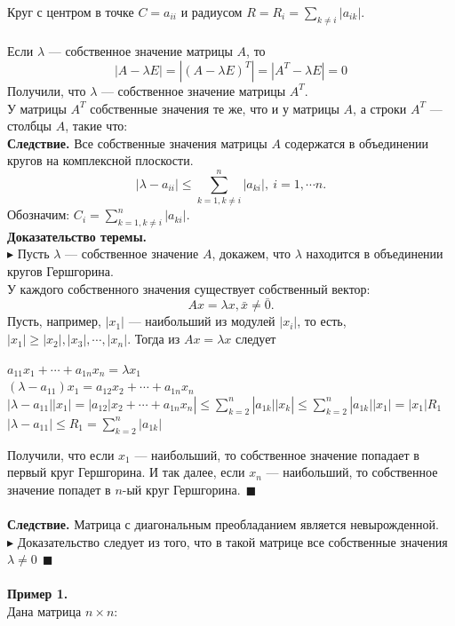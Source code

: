 \documentclass[12pt]{article}
\theoremstyle{definition}
\numberwithin{equation}{section}
\begin{document}
	Круг с центром в точке $C=a_{ii}$ и радиусом $R=R_i=\sum\limits_{k\neq i}|a_{ik}|.$\\
	\\
	Если $\lambda$ --- собственное значение матрицы $A$, то
	$$|A-\lambda E|=|(A-\lambda E)^T|=|A^T-\lambda E|=0$$
	Получили, что $\lambda$ --- собственное значение матрицы $A^T$.\\ 
	У матрицы $A^T$ собственные значения те же, что и у матрицы $A$, а строки $A^T$ --- столбцы $A$, такие что:\\
	\textbf{Следствие.} Все собственные значения матрицы $A$ содержатся в объединении кругов на комплексной плоскости. $$|\lambda-a_{ii}|\leqslant \sum\limits_{k=1, k\neq i}^n|a_{ki}|,~i=1,\cdots n.$$
	Обозначим: $C_i=\sum\limits_{k=1, k\neq i}^n|a_{ki}|.$\\
	\textbf{Доказательство теремы.}\\
	$\blacktriangleright$ Пусть $\lambda$ --- собственное значение $A$, докажем, что $\lambda$ находится в объединении кругов Гершгорина.\\
	У каждого собственного значения существует собственный вектор: $$Ax=\lambda x, \bar x\neq \bar 0.$$
	Пусть, например, $|x_1|$ --- наибольший из модулей $|x_i|$, то есть, $|x_1|\geqslant|x_2|,|x_3|,\cdots,|x_n|$. Тогда из $Ax=\lambda x$ следует
	\begin{center}
		$a_{11}x_1+\cdots+a_{1n}x_n=\lambda x_1$\\
		$(\lambda-a_{11})x_1=a_{12}x_2+\cdots+a_{1n}x_n$\\
		$|\lambda-a_{11}||x_1|=|a_{12}|x_2+\cdots+a_{1n}x_n|\leqslant\sum\limits_{k=2}^n|a_{1k}||x_k|\leqslant\sum\limits_{k=2}^n|a_{1k}||x_1|=|x_1|R_1$\\
		$|\lambda-a_{11}|\leqslant R_1=\sum\limits_{k=2}^n|a_{1k}|$
	\end{center}
	Получили, что если $x_1$ --- наибольший, то собственное значение попадает в первый круг Гершгорина. И так далее, если $x_n$ --- наибольший, то собственное значение попадет в $n$-ый круг Гершгорина.$~~\blacksquare$\\ \\
	\textbf{Следствие.} Матрица с диагональным преобладанием является невырожденной.\\
	$\blacktriangleright$ Доказательство следует из того, что в такой матрице все собственные значения $\lambda\neq 0~~\blacksquare$\\ \\
	\textbf{Пример 1.}\\
	Дана матрица $n\times n$:
\end{document}
